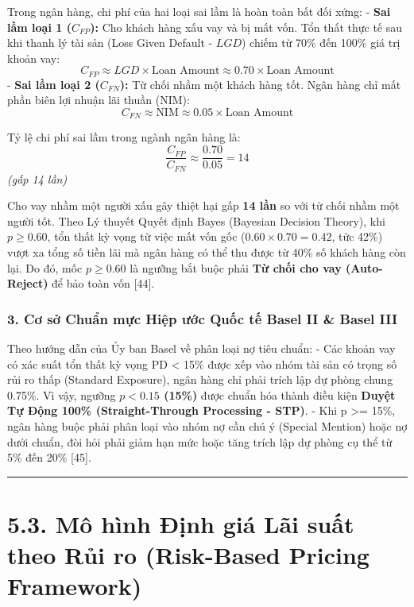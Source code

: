 \documentclass[
  13pt,
  a4paper,
]{report}
\begin{document}
Trong ngân hàng, chi phí của hai loại sai lầm là hoàn toàn bất đối xứng:
- \textbf{Sai lầm loại 1 (\(C_{FP}\)):} Cho khách hàng xấu vay và bị mất
vốn. Tổn thất thực tế sau khi thanh lý tài sản (Loss Given Default -
\(LGD\)) chiếm từ 70\% đến 100\% giá trị khoản vay:
\[C_{FP} \approx LGD \times \text{Loan Amount} \approx 0.70 \times \text{Loan Amount}\]
- \textbf{Sai lầm loại 2 (\(C_{FN}\)):} Từ chối nhầm một khách hàng tốt.
Ngân hàng chỉ mất phần biên lợi nhuận lãi thuần (NIM):
\[C_{FN} \approx \text{NIM} \approx 0.05 \times \text{Loan Amount}\]

Tỷ lệ chi phí sai lầm trong ngành ngân hàng là:
\[\frac{C_{FP}}{C_{FN}} \approx \frac{0.70}{0.05} = 14\] \emph{(gấp 14
lần)}

Cho vay nhầm một người xấu gây thiệt hại gấp \textbf{14 lần} so với từ
chối nhầm một người tốt. Theo Lý thuyết Quyết định Bayes (Bayesian
Decision Theory), khi \(p \ge 0.60\), tổn thất kỳ vọng từ việc mất vốn
gốc (\(0.60 \times 0.70 = 0.42\), tức 42\%) vượt xa tổng số tiền lãi mà
ngân hàng có thể thu được từ 40\% số khách hàng còn lại. Do đó, mốc
\textbf{\(p \ge 0.60\)} là ngưỡng bắt buộc phải \textbf{Từ chối cho vay
(Auto-Reject)} để bảo toàn vốn {[}44{]}.

\subsubsection{3. Cơ sở Chuẩn mực Hiệp ước Quốc tế Basel II \& Basel
III}\label{cux1a1-sux1edf-chuux1ea9n-mux1ef1c-hiux1ec7p-ux1b0ux1edbc-quux1ed1c-tux1ebf-basel-ii-basel-iii}

Theo hướng dẫn của Ủy ban Basel về phân loại nợ tiêu chuẩn: - Các khoản
vay có xác suất tổn thất kỳ vọng PD \textless{} 15\% được xếp vào nhóm
tài sản có trọng số rủi ro thấp (Standard Exposure), ngân hàng chỉ phải
trích lập dự phòng chung 0.75\%. Vì vậy, ngưỡng \textbf{\(p < 0.15\)
(15\%)} được chuẩn hóa thành điều kiện \textbf{Duyệt Tự Động 100\%
(Straight-Through Processing - STP)}. - Khi p \textgreater= 15\%, ngân
hàng buộc phải phân loại vào nhóm nợ cần chú ý (Special Mention) hoặc nợ
dưới chuẩn, đòi hỏi phải giảm hạn mức hoặc tăng trích lập dự phòng cụ
thể từ 5\% đến 20\% {[}45{]}.

\begin{center}\rule{0.5\linewidth}{0.5pt}\end{center}

\section{5.3. Mô hình Định giá Lãi suất theo Rủi ro (Risk-Based Pricing
Framework)}\label{muxf4-huxecnh-ux111ux1ecbnh-giuxe1-luxe3i-suux1ea5t-theo-rux1ee7i-ro-risk-based-pricing-framework}
\end{document}
